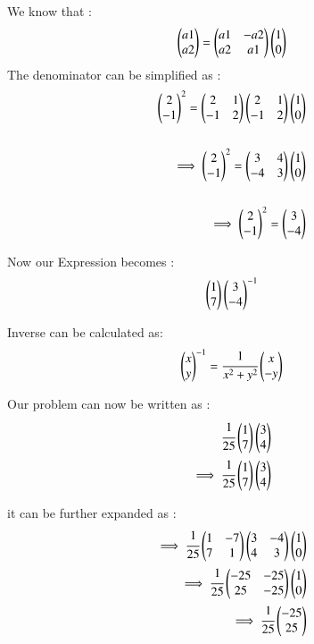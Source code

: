 \begin{enumerate}[label=\thesection.\arabic*.,ref=\thesection.\theenumi]
\begin{enumerate}
We know that :
\begin{align}
    \begin{pmatrix}a1 \\ a2\end{pmatrix} = \begin{pmatrix}a1 & -a2\\a2 & a1\end{pmatrix}\begin{pmatrix}1 \\ 0\end{pmatrix}
\end{align}
The denominator can be simplified as :
\begin{align}
    \begin{pmatrix}2 \\ -1\end{pmatrix}^2 = \begin{pmatrix}2 & 1\\-1 & 2\end{pmatrix}\begin{pmatrix}2 & 1\\-1 & 2\end{pmatrix}\begin{pmatrix}1 \\ 0\end{pmatrix}
\\ \\
    \implies \begin{pmatrix}2 \\ -1\end{pmatrix}^2 = \begin{pmatrix}3 & 4\\-4 & 3\end{pmatrix}\begin{pmatrix}1 \\ 0\end{pmatrix}
\\ \\
    \implies \begin{pmatrix}2 \\ -1\end{pmatrix}^2 = \begin{pmatrix}3 \\-4\end{pmatrix}
\end{align}

Now our Expression becomes :
\begin{align}
    \begin{pmatrix}1 \\ 7\end{pmatrix}\begin{pmatrix}3\\-4\end{pmatrix}^{-1}
\end{align}

Inverse can be calculated as:
\begin{align}
    \begin{pmatrix}x \\ y\end{pmatrix}^{-1}=\cfrac{1}{x^2+y^2}\begin{pmatrix}x\\-y\end{pmatrix}
\end{align}

Our problem can now be written as :
\begin{align}
    \cfrac{1}{25}\begin{pmatrix}1 \\ 7\end{pmatrix}\begin{pmatrix}3\\4\end{pmatrix}
\\
    \implies \cfrac{1}{25}\begin{pmatrix}1 \\ 7\end{pmatrix}\begin{pmatrix}3\\4\end{pmatrix}
\end{align}

it can be further expanded as :
\begin{align}
    \implies \cfrac{1}{25}\begin{pmatrix}1 & -7\\7 & 1\end{pmatrix}\begin{pmatrix}3 & -4\\4 & 3\end{pmatrix}\begin{pmatrix}1 \\ 0\end{pmatrix}
\\
    \implies \cfrac{1}{25}\begin{pmatrix}-25 & -25\\25 & -25\end{pmatrix}\begin{pmatrix}1 \\ 0\end{pmatrix}
\\
    \implies \cfrac{1}{25}\begin{pmatrix}-25 \\ 25\end{pmatrix}
\end{align}


\end{enumerate}
\end{enumerate}
